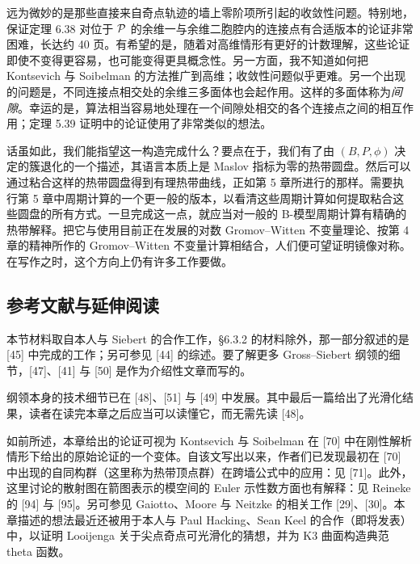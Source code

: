 远为微妙的是那些直接来自奇点轨迹的墙上零阶项所引起的收敛性问题。特别地，保证定理 6.38 对位于 $\mathcal{P}$ 的余维一与余维二胞腔内的连接点有合适版本的论证非常困难，长达约 40 页。有希望的是，随着对高维情形有更好的计数理解，这些论证即使不变得更容易，也可能变得更具概念性。另一方面，我不知道如何把 Kontsevich 与 Soibelman 的方法推广到高维；收敛性问题似乎更难。另一个出现的问题是，不同连接点相交处的余维三多面体也会起作用。这样的多面体称为\emph{间隙}。幸运的是，算法相当容易地处理在一个间隙处相交的各个连接点之间的相互作用；定理 5.39 证明中的论证使用了非常类似的想法。

话虽如此，我们能指望这一构造完成什么？要点在于，我们有了由 $(B,P,\phi)$ 决定的簇退化的一个描述，其语言本质上是 Maslov 指标为零的热带圆盘。然后可以通过粘合这样的热带圆盘得到有理热带曲线，正如第 5 章所进行的那样。需要执行第 5 章中周期计算的一个更一般的版本，以看清这些周期计算如何提取粘合这些圆盘的所有方式。一旦完成这一点，就应当对一般的 B-模型周期计算有精确的热带解释。把它与使用目前正在发展的对数 Gromov–Witten 不变量理论、按第 4 章的精神所作的 Gromov–Witten 不变量计算相结合，人们便可望证明镜像对称。在写作之时，这个方向上仍有许多工作要做。

\subsection{参考文献与延伸阅读}

本节材料取自本人与 Siebert 的合作工作，§6.3.2 的材料除外，那一部分叙述的是 [45] 中完成的工作；另可参见 [44] 的综述。要了解更多 Gross–Siebert 纲领的细节，[47]、[41] 与 [50] 是作为介绍性文章而写的。

纲领本身的技术细节已在 [48]、[51] 与 [49] 中发展。其中最后一篇给出了光滑化结果，读者在读完本章之后应当可以读懂它，而无需先读 [48]。

如前所述，本章给出的论证可视为 Kontsevich 与 Soibelman 在 [70] 中在刚性解析情形下给出的原始论证的一个变体。自该文写出以来，作者们已发现最初在 [70] 中出现的自同构群（这里称为热带顶点群）在跨墙公式中的应用：见 [71]。此外，这里讨论的散射图在箭图表示的模空间的 Euler 示性数方面也有解释：见 Reineke 的 [94] 与 [95]。另可参见 Gaiotto、Moore 与 Neitzke 的相关工作 [29]、[30]。本章描述的想法最近还被用于本人与 Paul Hacking、Sean Keel 的合作（即将发表）中，以证明 Looijenga 关于尖点奇点可光滑化的猜想，并为 K3 曲面构造典范 theta 函数。


